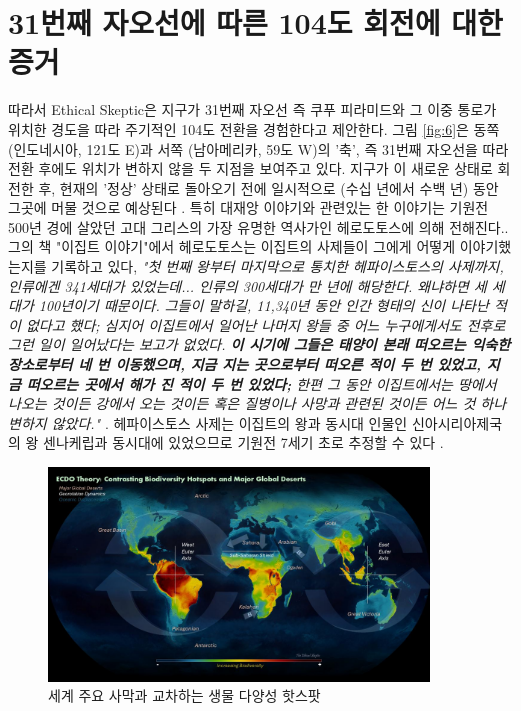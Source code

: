 \documentclass[10pt,twocolumn,letterpaper]{article}
\begin{document}
\section{31번째 자오선에 따른  104도 회전에 대한 증거}

따라서 Ethical Skeptic은 지구가 31번째 자오선 즉 쿠푸 피라미드와 그 이중 통로가 위치한 경도을 따라 주기적인 104도 전환을 경험한다고 제안한다. 그림 \ref{fig:6}은 동쪽 (인도네시아, 121도 E)과 서쪽 (남아메리카, 59도 W)의 '축', 즉 31번째 자오선을 따라 전환 후에도 위치가 변하지 않을 두 지점을 보여주고 있다. 지구가 이 새로운 상태로 회전한 후, 현재의 '정상' 상태로 돌아오기 전에 일시적으로 (수십 년에서 수백 년) 동안 그곳에 머물 것으로 예상된다 \cite{150}.
특히 대재앙 이야기와 관련있는 한 이야기는 기원전 500년 경에 살았던 고대 그리스의 가장 유명한 역사가인 헤로도토스에 의해 전해진다.\cite{31}. 그의 책 "이집트 이야기"에서 헤로도토스는 이집트의 사제들이 그에게 어떻게 이야기했는지를 기록하고 있다, \textit{"첫 번째 왕부터 마지막으로 통치한 헤파이스토스의 사제까지, 인류에겐  341세대가 있었는데... 인류의 300세대가 만 년에 해당한다. 왜냐하면 세 세대가 100년이기 때문이다. 그들이 말하길, 11,340년 동안 인간 형태의 신이 나타난 적이 없다고 했다; 심지어 이집트에서 일어난 나머지 왕들 중 어느 누구에게서도 전후로 그런 일이 일어났다는 보고가 없었다. \textbf{이 시기에 그들은 태양이 본래 떠오르는 익숙한 장소로부터 네 번 이동했으며, 지금 지는 곳으로부터 떠오른 적이 두 번 있었고, 지금 떠오르는 곳에서 해가 진 적이 두 번 있었다;} 한편 그 동안  이집트에서는 땅에서 나오는 것이든 강에서 오는 것이든 혹은 질병이나 사망과 관련된 것이든 어느 것 하나 변하지 않았다."} \cite{32}. 헤파이스토스 사제는 이집트의 왕과 동시대 인물인 신아시리아제국의 왕 센나케립과 동시대에 있었으므로 기원전 7세기 초로 추정할 수 있다 \cite{32,33,34}.

\begin{figure}[t]
\begin{center}
\includegraphics[width=0.9\textwidth]{biodiversity.jpg}
\end{center}
   \caption{세계 주요 사막과 교차하는 생물 다양성 핫스팟 \cite{28}}
\label{fig:9}
\end{figure}
\end{document}
